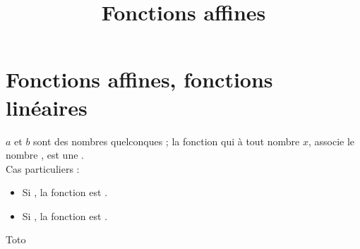 \documentclass[xcolor={dvipsnames}]{beamer}
\title{Fonctions affines}
\author{}\institute{}
\begin{document}
\begin{frame}
  \titlepage 
\end{frame}

\section{Fonctions affines, fonctions linéaires}

\begin{frame}
\begin{mydefs}
	
	$a$ et $b$ sont des nombres quelconques ; la fonction qui à tout nombre $x$, associe le nombre , est une .\\
	
	
	Cas particuliers :
	\begin{itemize}
		\item Si , la fonction est .
		\item Si , la fonction est .
	\end{itemize}
\end{mydefs}
\end{frame}


\begin{frame}


\begin{myobj}
	Toto
\end{myobj}
\end{frame}
\end{document}
